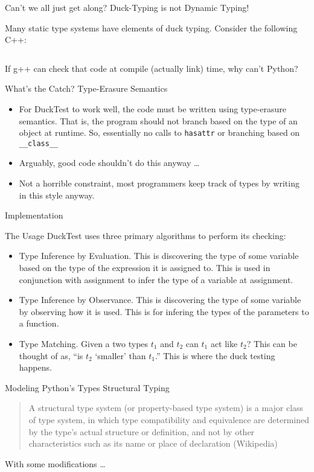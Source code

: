 \documentclass[12pt,t]{beamer}
\newcommand{\bi}{\begin{itemize}}
\newcommand{\ei}{\end{itemize}}
\newcommand{\subt}[1]{{\footnotesize \color{subtitle} {#1}}}
\newcommand{\codepy}{\texttt}
\newcommand{\vitem}{\vfill\item}
\begin{document}
\begin{frame}{Can't we all just get along?}
    \subt{Duck-Typing is not Dynamic Typing!}

    Many static type systems have elements of duck typing. Consider
    the following C++:

    \vfill
    \inputminted{cpp}{code/cpp.cpp}
    \vfill

    If g++ can check that code at compile (actually link) time, why
    can't Python?
\end{frame}

\begin{frame}{What's the Catch?}
    \subt{Type-Erasure Semantics}
    \bi
    \vitem For DuckTest to work well, the code must be written using type-erasure
    semantics. That is, the program should not branch based on the type of
    an object at runtime. So, essentially no calls to \codepy{hasattr} or
    branching based on \codepy{__class__}
    \vitem Arguably, good code shouldn't do this anyway \ldots
    \vitem Not a horrible constraint, most programmers keep track of types by
    writing in this style anyway.
    \ei
\end{frame}

\begin{frame}
    \vfill
    \centering\large Implementation
\end{frame}

\begin{frame}{The Usage}
    DuckTest uses three primary algorithms to perform its checking:
    \bi
        \vitem Type Inference by Evaluation. This is discovering the type of some
        variable based on the type of the expression it is assigned to. This is
        used in conjunction with assignment to infer the type of a variable at assignment.

        \vitem Type Inference by Observance. This is discovering the type of some
        variable by observing how it is used. This is for infering the types of the
        parameters to a function.

        \vitem Type Matching. Given a two types $t_1$ and $t_2$ can $t_1$ act like $t_2$?
        This can be thought of as, ``is $t_2$ `smaller' than $t_1$.'' This is where the
        duck testing happens.
    \ei
\end{frame}

\begin{frame}{Modeling Python's Types}
    \vspace{0.5cm}
    {\large \color{subtitle} {Structural Typing}}

    \begin{quote}
        A structural type system (or property-based
        type system) is a major class of type system, in which type
        compatibility and equivalence are determined by the type's actual
        structure or definition, and not by other characteristics such as its
        name or place of declaration (Wikipedia)
    \end{quote}

    \vfill
    With some modifications \ldots
\end{frame}
\end{document}
